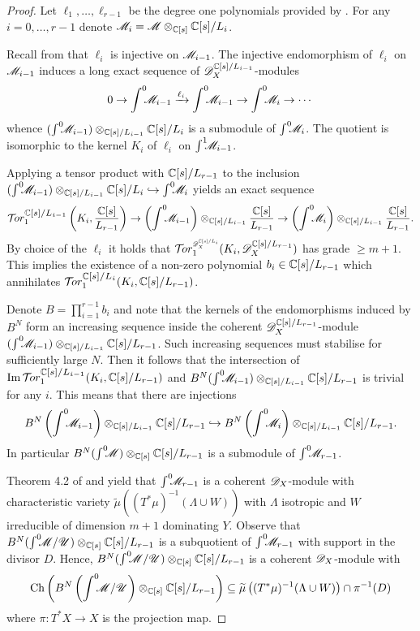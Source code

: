 \begin{proof}
  Let $\ell_1,\ldots,\ell_{r-1}$ be the degree one polynomials provided by .
  For any $i=0,\ldots, r-1$ denote $\mathscr{M}_i =  \mathscr{M} \otimes_{\mathbb{C}[s]} \mathbb{C}[s]/L_{i}$.

  Recall from  that $\ell_{i}$ is injective on $\mathscr{M}_{i-1}$.
  The injective endomorphism of $\ell_i$ on $\mathscr{M}_{i-1}$ induces a long exact sequence of $\mathscr{D}_X^{\mathbb{C}[s]/L_{i-1}}$-modules
  $$0 \to\int^0 \mkern -8mu\mathscr{M}_{i-1} \xrightarrow{\ell_i} \int^0 \mkern -8mu \mathscr{M}_{i-1} \to \int^0 \mkern -8mu \mathscr{M}_i \to \cdots $$
  whence $(\int^0 \mkern -8mu\mathscr{M}_{i-1})\otimes_{\mathbb{C}[s]/L_{i-1}} \mathbb{C}[s]/L_i$ is a submodule of $\int^0 \mkern -8mu\mathscr{M}_i$.
  The quotient is isomorphic to the kernel $K_i$ of $\ell_i$ on $\int^1 \mkern -8mu\mathscr{M}_{i-1}$.

  Applying a tensor product with $\mathbb{C}[s]/L_{r-1}$ to the inclusion $(\int^0 \mkern -8mu \mathscr{M}_{i-1}) \otimes_{\mathbb{C}[s]/L_{i-1}} \mathbb{C}[s]/L_i \hookrightarrow \int^0 \mkern -8mu\mathscr{M}_i$ yields an exact sequence
  $$\Tr{\C[s]/L_{i-1}}{1}\left(K_i, \frac{\C[s]}{L_{r-1}}\right) \to \left(\IntJ{0} \M_{i-1}\right) \otimes_{\C[s]/L_{i-1}}\frac{\C[s]}{L_{r-1}} \to \left(\IntJ{0}\M_i\right) \otimes_{\C[s]/L_{i-1}}\frac{\C[s]}{L_{r-1}}.$$
  By choice of the $\ell_i$ it holds that $\Tr{\D_X^{\C[s]/L_i} }{1}(K_i, \D_X^{\C[s]/L_{r-1}})$ has grade $\geq m+1$.
  This implies the existence of a non-zero polynomial $b_i\in \mathbb{C}[s]/L_{r-1}$ which annihilates $\Tr{\C[s]/L_{i}}{1}(K_i, \C[s]/L_{r-1} )$.

  Denote $B = \prod_{i=1}^{r-1}b_i$ and note that the kernels of the endomorphisms induced by $B^N$ form an increasing sequence inside the coherent $\mathscr{D}_X^{\mathbb{C}[s]/L_{r-1}}$-module $(\int^0 \mkern -8mu \mathscr{M}_{i-1})\otimes_{\mathbb{C}[s]/L_{i-1}}\mathbb{C}[s]/L_{r-1}$.
  Such increasing sequences must stabilise for sufficiently large $N$.
  Then it follows that the intersection of $\img \Tr{\C[s]/L_{i-1}}{1}(K_i, \C[s]\allowbreak/L_{r-1})$ and $ B^N(\int^0 \mkern -8mu \mathscr{M}_{i-1}) \otimes_{\mathbb{C}[s]/L_{i-1}}\mathbb{C}[s]/L_{r-1}$ is trivial for any $i$.
  This means that there are injections $$B^N \left(\int^0 \mkern -8mu \mathscr{M}_{i-1}\right) \otimes_{\mathbb{C}[s]/L_{i-1}}\mathbb{C}[s]/L_{r-1} \hookrightarrow B^N \left(\int^0 \mkern -8mu\mathscr{M}_i\right)\otimes_{\mathbb{C}[s]/L_{i-1}}\mathbb{C}[s]/L_{r-1}.$$
  In particular $B^N(\int^0 \mkern -8mu\mathscr{M})\otimes_{\mathbb{C}[s]}\mathbb{C}[s]/L_{r-1}$ is a submodule of $\int^0 \mkern -8mu\mathscr{M}_{r-1}$.


  Theorem 4.2 of \cite{kashiwara1976b} and  yield that $\int^0 \mkern -8mu\mathscr{M}_{r-1}$ is a coherent $\mathscr{D}_X$-module with characteristic variety $\widetilde{\mu}((T^*\mu)^{-1}(\Lambda\cup W))$ with $\Lambda$ isotropic and $W$ irreducible of dimension $m+1$ dominating $Y$.
  Observe that $B^N(\int^0 \mkern -8mu\mathscr{M}/ \mathscr{U})\otimes_{\mathbb{C}[s]}\mathbb{C}[s]/L_{r-1}$ is a subquotient of $\int^0 \mkern -8mu\mathscr{M}_{r-1}$ with support in the divisor $D$.
  Hence, $B^N(\int^0 \mkern -8mu\mathscr{M}/ \mathscr{U})\otimes_{\mathbb{C}[s]}\mathbb{C}[s]/L_{r-1}$ is a coherent $\mathscr{D}_X$-module with
  $$\operatorname{Ch}\left( B^N\left(\int^0 \mkern -8mu\mathscr{M}/ \mathscr{U}\right)\otimes_{\mathbb{C}[s]}\mathbb{C}[s]/L_{r-1} \right)\subseteq  \widetilde{\mu}\left((T^*\mu)^{-1}(\Lambda\cup W)\right) \cap \pi^{-1}(D)$$
  where $\pi:T^*X\to X$ is the projection map.


\end{proof}
